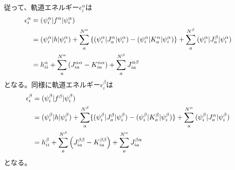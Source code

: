 従って、軌道エネルギー$\epsilon^\alpha_i$は
\begin{align}
	\epsilon^\alpha_i
&=
	\spaceone{\psi^\alpha_i}{f^\alpha}{\psi^\alpha_i} \\
%
%
&=
	\spaceone{\psi^\alpha_i}{h}{\psi^\alpha_i}
	+
	\sum_a^{N^\alpha}\left\{
		\spaceone{\psi^\alpha_i}{J^\alpha_a}{\psi^\alpha_i}
		-
		\spaceone{\psi^\alpha_i}{K^\alpha_a}{\psi^\alpha_i}
	\right\}
	+
	\sum_a^{N^\beta}
		\spaceone{\psi^\alpha_i}{J^\beta_a}{\psi^\alpha_i} \\
%
%
&=
	h^\alpha_{ii}
	+
	\sum_a^{N^\alpha}\left(
		J^{\alpha\alpha}_{ia}
		-
		K^{\alpha\alpha}_{ia}
	\right)
	+
	\sum_a^{N^\beta}
		J^{\alpha\beta}_{ia}
\end{align}
となる。同様に軌道エネルギー$\epsilon^\beta_i$は
\begin{align}
	\epsilon^\beta_i
&=
	\spaceone{\psi^\beta_i}{f^\beta}{\psi^\beta_i} \\
%
%
&=
	\spaceone{\psi^\beta_i}{h}{\psi^\beta_i}
	+
	\sum_a^{N^\beta}\{
		\spaceone{\psi^\beta_i}{J^\beta_a}{\psi^\beta_i}
		-
		\spaceone{\psi^\beta_i}{K^\beta_a}{\psi^\beta_i}
	\}
	+
	\sum_a^{N^\alpha}
		\spaceone{\psi^\beta_i}{J^\alpha_a}{\psi^\beta_i} \\
%
%
&=
	h^\beta_{ii}
	+
	\sum_a^{N^\beta}\left(
		J^{\beta\beta}_{ia}
		-
		K^{\beta\beta}_{ia}
	\right)
	+
	\sum_a^{N^\alpha}
		J^{\beta\alpha}_{ia}
\end{align}
となる。

